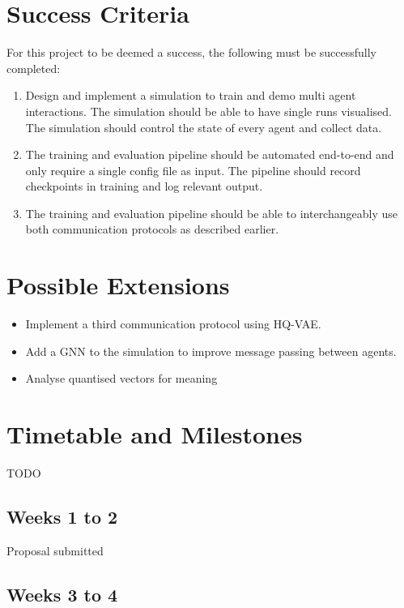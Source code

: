 \documentclass[20pt]{article}
\begin{document}
\section{Success Criteria}

For this project to be deemed a success, the following must be successfully completed:

\begin{enumerate}
\item Design and implement a simulation to train and demo multi agent interactions. The simulation should be able to have single runs visualised. The simulation should control the state of every agent and collect data.
\item The training and evaluation pipeline should be automated end-to-end and only require a single config file as input. The pipeline should record checkpoints in training and log relevant output.
\item The training and evaluation pipeline should be able to interchangeably use both communication protocols as described earlier.
\end{enumerate}



\section{Possible Extensions}

\begin{itemize}
\item Implement a third communication protocol using HQ-VAE. 
\item Add a GNN to the simulation to improve message passing between agents.
\item Analyse quantised vectors for meaning
\end{itemize}

\pagebreak

\section{Timetable and Milestones}

TODO

\subsection*{Weeks 1 to 2}
Proposal submitted

\subsection*{Weeks 3 to 4}
\end{document}
